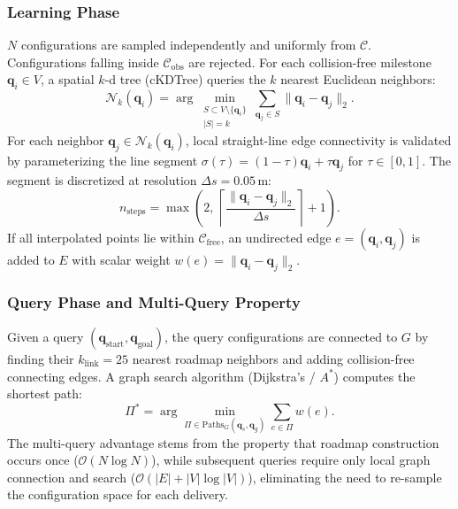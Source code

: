 \documentclass[12pt,a4paper]{article}
\begin{document}
\subsubsection{Learning Phase}
$N$ configurations are sampled independently and uniformly from $\mathcal{C}$. Configurations falling inside $\mathcal{C}_{\text{obs}}$ are rejected. For each collision-free milestone $\mathbf{q}_i \in V$, a spatial $k$-d tree (cKDTree) queries the $k$ nearest Euclidean neighbors:
\begin{equation}
\mathcal{N}_k(\mathbf{q}_i) = \arg\min_{\substack{S \subset V \setminus \{\mathbf{q}_i\} \\ |S| = k}} \sum_{\mathbf{q}_j \in S} \|\mathbf{q}_i - \mathbf{q}_j\|_2.
\end{equation}
For each neighbor $\mathbf{q}_j \in \mathcal{N}_k(\mathbf{q}_i)$, local straight-line edge connectivity is validated by parameterizing the line segment $\sigma(\tau) = (1 - \tau)\mathbf{q}_i + \tau \mathbf{q}_j$ for $\tau \in [0, 1]$. The segment is discretized at resolution $\Delta s = 0.05\,\text{m}$:
\begin{equation}
n_{\text{steps}} = \max\left(2, \, \left\lceil \frac{\|\mathbf{q}_i - \mathbf{q}_j\|_2}{\Delta s} \right\rceil + 1 \right).
\end{equation}
If all interpolated points lie within $\mathcal{C}_{\text{free}}$, an undirected edge $e = (\mathbf{q}_i, \mathbf{q}_j)$ is added to $E$ with scalar weight $w(e) = \|\mathbf{q}_i - \mathbf{q}_j\|_2$.

\subsubsection{Query Phase and Multi-Query Property}
Given a query $(\mathbf{q}_{\text{start}}, \mathbf{q}_{\text{goal}})$, the query configurations are connected to $G$ by finding their $k_{\text{link}} = 25$ nearest roadmap neighbors and adding collision-free connecting edges. A graph search algorithm (Dijkstra's / $A^*$) computes the shortest path:
\begin{equation}
\Pi^* = \arg\min_{\Pi \in \text{Paths}_G(\mathbf{q}_s, \mathbf{q}_g)} \sum_{e \in \Pi} w(e).
\end{equation}
The multi-query advantage stems from the property that roadmap construction occurs once ($\mathcal{O}(N \log N)$), while subsequent queries require only local graph connection and search ($\mathcal{O}(|E| + |V| \log |V|)$), eliminating the need to re-sample the configuration space for each delivery.
\end{document}
